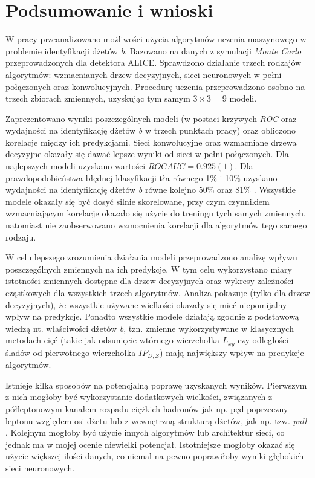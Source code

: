 \section{Podsumowanie i wnioski}
\label{sec:podsumowanie}

W pracy przeanalizowano możliwości użycia algorytmów uczenia maszynowego w problemie identyfikacji dżetów \textit{b}.
Bazowano na danych z symulacji \textit{Monte Carlo} przeprowadzonych dla detektora ALICE.
Sprawdzono działanie trzech rodzajów algorytmów: wzmacnianych drzew decyzyjnych, sieci neuronowych w pełni połączonych oraz konwolucyjnych.
Procedurę uczenia przeprowadzono osobno na trzech zbiorach zmiennych, uzyskując tym samym $3\times3=9$ modeli. 

Zaprezentowano wyniki poszczególnych modeli (w postaci krzywych \textit{ROC} oraz wydajności na identyfikację  dżetów \textit{b} w trzech punktach pracy) oraz obliczono korelacje między ich predykcjami.
Sieci konwolucyjne oraz wzmacniane drzewa decyzyjne okazały się dawać lepsze wyniki od sieci w pełni połączonych.
Dla najlepszych modeli uzyskano wartości $ROC AUC = 0.925(1)$.
Dla prawdopodobieństwa błędnej klasyfikacji tła równego 1\% i 10\% uzyskano wydajności na identyfikację dżetów \textit{b} równe kolejno 50\% oraz 81\% .
Wszystkie modele okazały się być dosyć silnie skorelowane, przy czym czynnikiem wzmacniającym korelacje okazało się użycie do treningu tych samych zmiennych, natomiast nie zaobserwowano wzmocnienia korelacji dla algorytmów tego samego rodzaju.

W celu lepszego zrozumienia działania modeli przeprowadzono analizę wpływu poszczególnych zmiennych na ich predykcje. W tym celu wykorzystano miary istotności zmiennych dostępne dla drzew decyzyjnych oraz wykresy zależności cząstkowych dla wszystkich trzech algorytmów.
Analiza pokazuje (tylko dla drzew decyzyjnych), że wszystkie używane wielkości okazały się mieć niepomijalny wpływ na predykcje.
Ponadto wszystkie modele działają zgodnie z podstawową wiedzą nt. właściwości dżetów \textit{b}, tzn. zmienne wykorzystywane w klasycznych metodach cięć (takie jak odsunięcie wtórnego wierzchołka $L_{xy}$ czy odległości śladów od pierwotnego wierzchołka $IP_{D,Z}$) mają największy wpływ na predykcje algorytmów. 

Istnieje kilka sposobów na potencjalną poprawę uzyskanych wyników. 
Pierwszym z nich mogłoby być wykorzystanie dodatkowych wielkości, związanych z półleptonowym kanałem rozpadu ciężkich hadronów jak np. pęd poprzeczny leptonu względem osi dżetu lub z wewnętrzną strukturą dżetów, jak np. tzw. \textit{pull} \cite{Gallicchio:2010sw}. 
Kolejnym mogłoby być użycie innych algorytmów lub architektur sieci, co jednak ma w mojej ocenie niewielki potencjał.
Istotniejsze mogłoby okazać się użycie większej ilości danych, co niemal na pewno poprawiłoby wyniki głębokich sieci neuronowych.


